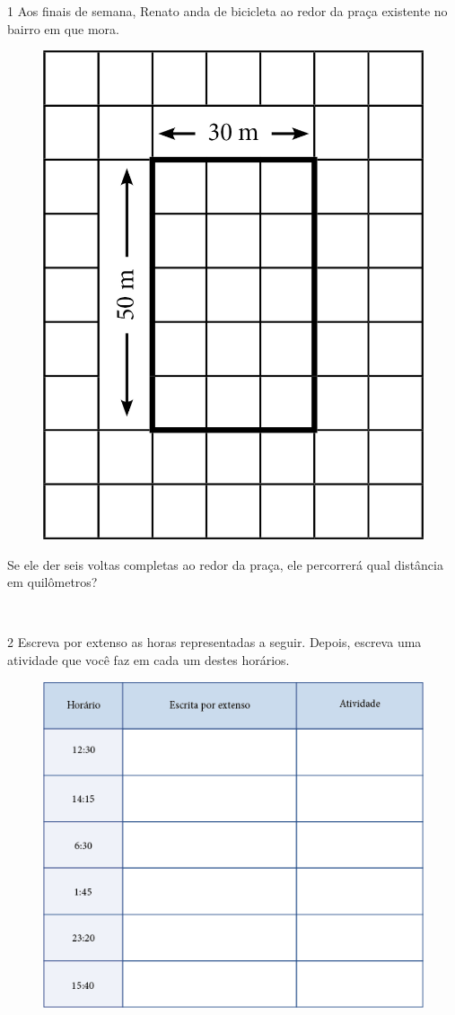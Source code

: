 
\num{1} Aos finais de semana, Renato anda de bicicleta ao redor da praça
existente no bairro em que mora.
\pagebreak

\begin{figure}[htpb!]
\centering
\includegraphics[width=.3\textwidth]{media/image27.png}
\end{figure}

Se ele der seis voltas completas ao redor da praça, ele percorrerá qual
distância em quilômetros?

\begin{mdframed}[linewidth=2pt,linecolor=salmao,roundcorner=2pt]
\\
\end{mdframed}


\num{2} Escreva por extenso as horas representadas a seguir. Depois, escreva uma atividade que você faz em cada um destes horários.

\begin{figure}[htpb!]
\centering
\includegraphics[width=.65\textwidth]{media/image28.png}
\end{figure}

